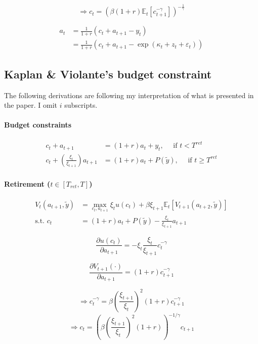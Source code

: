 \documentclass[11pt]{article}
\begin{document}
\begin{equation}
  \Rightarrow c_t = \left( \beta (1+r) \mathbb{E}_t [c_{t+1}^{-\gamma}]  \right) ^{-\frac{1}{\gamma}}
\end{equation}

\begin{equation}
\begin{split}
a_{t} &= \frac{1}{1+r} \left( c_t + a_{t+1} - y_t \right) \\
      &= \frac{1}{1+r} \left( c_t + a_{t+1} - \exp( \kappa_t + z_{t} + \varepsilon_{t}) \right)
\end{split}
\end{equation}

\subsection*{Kaplan \& Violante's budget constraint}

The following derivations are following my interpretation of what is presented in the paper. I omit $i$ subscripts.

\paragraph{Budget constraints}
$$
\begin{aligned}
c_{t}+a_{t+1} &=(1+r) a_{t}+y_{t}, \quad \text { if } t<T^{r e t}\\
c_{t}+\left(\frac{\xi_{t}}{\xi_{t+1}}\right) a_{t+1} &= (1+r) a_{t}+P\left(\tilde{y}\right), \quad \text { if } t \geq T^{r e t}
\end{aligned}
$$

\paragraph{Retirement ($t \in [T_{ret}, T]$)}

\begin{equation*}
\begin{split}
 V_{t}(a_{t+1}, \tilde{y}) &= \max_{c_t,a_{t+1}} \xi_{t} u(c_{t}) + \beta \xi_{t+1} \mathbb{E}_t[V_{t+1}(a_{t+2}, \tilde{y})] \\
  \text{s.t. } c_t &= (1+r) a_{t}+P(\tilde{y}) - \frac{\xi_{t}}{\xi_{t+1}} a_{t+1}
\end{split}
\end{equation*}

$$ \frac{\partial{u(c_t)}}{\partial{a_{t+1}}} = -\xi_t \frac{\xi_t}{\xi_{t+1}} c_t^{-\gamma} $$

$$ \frac{\partial{V_{t+1}(\cdot)}}{\partial{a_{t+1}}} = (1+r) c_{t+1}^{-\gamma} $$

$$ \Rightarrow c_t^{-\gamma} = \beta \left(
    \frac{\xi_{t+1}}{\xi_t} \right) ^2 (1+r) c_{t+1}^{-\gamma} $$
$$ \Rightarrow c_t = \left(\beta \left(
    \frac{\xi_{t+1}}{\xi_t} \right) ^2 (1+r) \right)^{-1/\gamma} c_{t+1} $$
\end{document}

